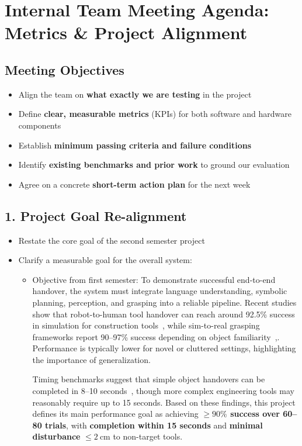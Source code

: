 \documentclass[12pt]{article}
\begin{document}
\section*{Internal Team Meeting Agenda: Metrics \& Project Alignment}

\subsection*{Meeting Objectives}
\begin{itemize}
    \item Align the team on \textbf{what exactly we are testing} in the project
    \item Define \textbf{clear, measurable metrics} (KPIs) for both software and hardware components
    \item Establish \textbf{minimum passing criteria and failure conditions}
    \item Identify \textbf{existing benchmarks and prior work} to ground our evaluation
    \item Agree on a concrete \textbf{short-term action plan} for the next week
\end{itemize}

\subsection*{1. Project Goal Re-alignment}
\begin{itemize}
    \item Restate the core goal of the second semester project
    \item Clarify a measurable goal for the overall system:
    \begin{itemize}
      \item Objective from first semester:
      To demonstrate successful end-to-end handover, the system must integrate language understanding, symbolic planning, perception, and grasping into a reliable pipeline. Recent studies show that robot-to-human tool handover can reach around 92.5\% success in simulation for construction tools~\cite{iaarc2025_handover}, while sim-to-real grasping frameworks report 90--97\% success depending on object familiarity~\cite{mogpe2022},\cite{grasping2023}. Performance is typically lower for novel or cluttered settings, highlighting the importance of generalization.  

      Timing benchmarks suggest that simple object handovers can be completed in 8--10 seconds~\cite{handover2024_fast}, though more complex engineering tools may reasonably require up to 15 seconds. Based on these findings, this project defines its main performance goal as achieving \textbf{$\geq90\%$ success over 60–80 trials}, with \textbf{completion within 15 seconds} and \textbf{minimal disturbance} $\leq\SI{2}{\centi\meter}$ to non-target tools.
    \end{itemize}

\end{itemize}
\end{document}
